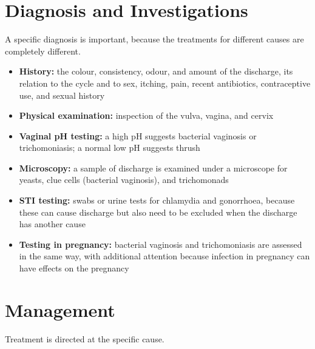 \section*{Diagnosis and Investigations}
A specific diagnosis is important, because the treatments for different causes are completely different.

\begin{itemize}
    \item \textbf{History:} the colour, consistency, odour, and amount of the discharge, its relation to the cycle and to sex, itching, pain, recent antibiotics, contraceptive use, and sexual history
    \item \textbf{Physical examination:} inspection of the vulva, vagina, and cervix
    \item \textbf{Vaginal pH testing:} a high pH suggests bacterial vaginosis or trichomoniasis; a normal low pH suggests thrush
    \item \textbf{Microscopy:} a sample of discharge is examined under a microscope for yeasts, clue cells (bacterial vaginosis), and trichomonads
    \item \textbf{STI testing:} swabs or urine tests for chlamydia and gonorrhoea, because these can cause discharge but also need to be excluded when the discharge has another cause
    \item \textbf{Testing in pregnancy:} bacterial vaginosis and trichomoniasis are assessed in the same way, with additional attention because infection in pregnancy can have effects on the pregnancy
\end{itemize}

\section*{Management}
Treatment is directed at the specific cause.


